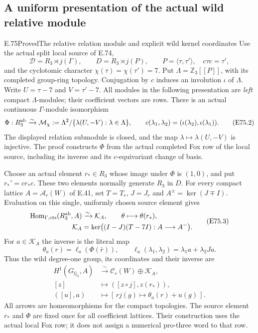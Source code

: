 \subsection{A uniform presentation of the actual wild relative module}

\begin{statement}{E.75}{Proved}{The relative relation module and explicit wild kernel coordinates}
Use the actual split local source of E.74,
\[
 \mathcal D=R_3\rtimes j(\Gamma),\qquad
 D=R_3\rtimes j(P),\qquad
 P=\langle\tau,\tau'\rangle,\quad c\tau c=\tau',
 \tag{E75.1}
\]
and the cyclotomic character $\chi(\tau)=\chi(\tau')=7$.
Put $\Lambda=\mathbb Z_3[[P]]$, with its completed
group-ring topology. Conjugation by $c$ induces an
involution $\iota$ of $\Lambda$. Write
$U=\tau-7$ and $V=\tau'-7$. All modules in the following
presentation are \emph{left} compact $\Lambda$-modules;
their coefficient vectors are rows. There is an actual
continuous $\Gamma$-module isomorphism
\[
 \Phi:R_3^{\rm ab}\xrightarrow{\sim}
 \mathcal M_\chi
 :=\Lambda^2/\{\lambda(U,-V):\lambda\in\Lambda\},
 \qquad
 c(\lambda_1,\lambda_2)
   =(\iota(\lambda_2),\iota(\lambda_1)).
 \tag{E75.2}
\]
The displayed relation submodule is closed, and the map
$\lambda\mapsto\lambda(U,-V)$ is injective. The proof
constructs $\Phi$ from the actual completed Fox row of
the local source, including its inverse and its
$c$-equivariant change of basis.

Choose an actual element $r_*\in R_3$ whose image under
$\Phi$ is $(1,0)$, and put $r_*'=cr_*c$. These two
elements normally generate $R_3$ in $D$. For every
compact lattice $A=\mathcal A_r(W)$ of E.41, set
$T=T_r$, $J=J_r$ and $A^\pm=\ker(J\mp I)$. Evaluation
on this single, uniformly chosen source element gives
\[
 \begin{split}
 \operatorname{Hom}_{\Gamma,\rm cts}(R_3^{\rm ab},A)
   &\xrightarrow{\sim}\mathcal K_A,\qquad
       \theta\longmapsto\theta(r_*),\qquad\\
 \mathcal K_A
   &=\ker\bigl((I-J)(T-7I):A\longrightarrow A^-\bigr).
 \end{split}
 \tag{E75.3}
\]
For $a\in\mathcal K_A$ the inverse is the literal map
\[
 \theta_a(r)=\ell_a(\Phi(\bar r)),\qquad
 \ell_a(\lambda_1,\lambda_2)=\lambda_1a+\lambda_2Ja.
 \tag{E75.4}
\]
Thus the wild degree-one group, its coordinates and
their inverse are
\[
 \begin{split}
 H^1(G_{\mathbb Q_3},A)
   &\xrightarrow{\sim}
       \mathcal C_r(W)\oplus\mathcal K_A,\\
 [z]&\longmapsto
       ([z\circ j],z(r_*)),\\
 ([u],a)&\longmapsto
       [\,rj(g)\longmapsto\theta_a(r)+u(g)\,].
 \end{split}
 \tag{E75.5}
\]
All arrows are homeomorphisms for the compact topologies.
The source element $r_*$ and $\Phi$ are fixed once for
all coefficient lattices. Their construction uses the
actual local Fox row; it does not assign a numerical
pro-three word to that row.


\end{statement}
